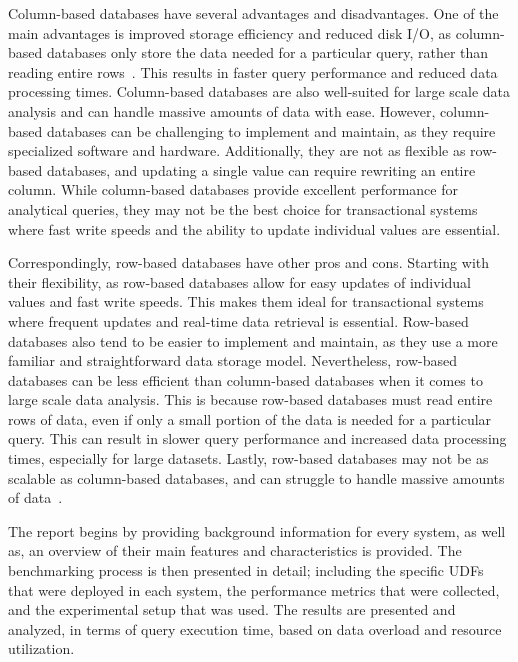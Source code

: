 Column-based databases have several advantages and disadvantages. 
One of the main advantages is improved storage efficiency and reduced disk I/O, 
as column-based databases only store the data needed for a particular query, 
rather than reading entire rows~\cite{BHSB14}. 
This results in faster query performance and reduced data processing times. 
Column-based databases are also well-suited for large scale data analysis and can handle massive amounts of data with ease. 
However, column-based databases can be challenging to implement and maintain, as they require specialized software and hardware. 
Additionally, they are not as flexible as row-based databases, and updating a single value can require rewriting an entire column. 
While column-based databases provide excellent performance for analytical queries, 
they may not be the best choice for transactional systems 
where fast write speeds and the ability to update individual values are essential.

Correspondingly, row-based databases have other pros and cons. 
Starting with their flexibility, as row-based databases allow for easy updates of individual values and fast write speeds.
This makes them ideal for transactional systems where frequent updates and real-time data retrieval is essential. 
Row-based databases also tend to be easier to implement and maintain, 
as they use a more familiar and straightforward data storage model. 
Nevertheless, row-based databases can be less efficient than column-based databases when it comes 
to large scale data analysis. 
This is because row-based databases must read entire rows of data, 
even if only a small portion of the data is needed for a particular query. 
This can result in slower query performance and increased data processing times, 
especially for large datasets. 
Lastly, row-based databases may not be as scalable as column-based databases, 
and can struggle to handle massive amounts of data~\cite{BHSB14}.


The report begins by providing background information 
for every system, as well as, an overview 
of their main features and characteristics is provided.
The benchmarking process is then presented in detail; 
including the specific UDFs that were deployed in each system, 
the performance metrics that were collected, 
and the experimental setup that was used. 
The results are presented and analyzed, 
in terms of query execution time, 
based on data overload and resource utilization. 

